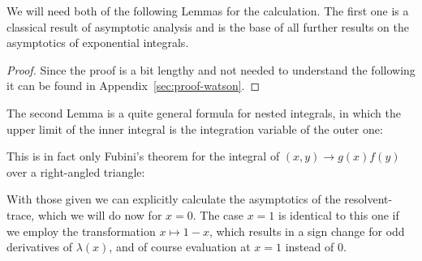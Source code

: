 We will need both of the following Lemmas for the calculation. The first one is
a classical result of asymptotic analysis and is the base of all further results
on the asymptotics of exponential integrals.
\begin{Lemma}[Watson]
  
  \begin{proof}
    Since the proof is a bit lengthy and not needed to understand the following
    it can be found in Appendix~\ref{sec:proof-watson}.
  \end{proof}
\end{Lemma}

The second Lemma is a quite general formula for nested integrals, in which the
upper limit of the inner integral is the integration variable of the outer one:

\begin{Remark}
  This is in fact only Fubini's theorem for the integral of $(x,y)\to g(x)f(y)$
  over a right-angled triangle:
  \begin{center}
  \end{center}
\end{Remark}

With those given we can explicitly calculate the asymptotics of the
resolvent-trace, which we will do now for $x=0$. The case $x=1$ is identical to
this one if we employ the transformation $x\mapsto 1-x$, which results in a sign
change for odd derivatives of $\lambda(x)$, and of course evaluation at $x=1$
instead of $0$.


